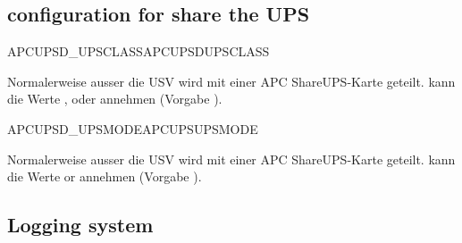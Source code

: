 \subsection{configuration for share the UPS}

\begin {description}

 {APCUPSD\_UPSCLASS}{APCUPSDUPSCLASS}

   Normalerweise  ausser die USV wird mit einer 
   APC ShareUPS-Karte geteilt.
    kann die Werte 
   ,  oder  annehmen
   (Vorgabe ).


 {APCUPSD\_UPSMODE}{APCUPSUPSMODE}

   Normalerweise  ausser die USV wird mit einer 
   APC ShareUPS-Karte geteilt.
    kann die Werte  or  
   annehmen (Vorgabe ).

\end {description}

\subsection{Logging system}

